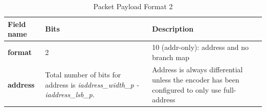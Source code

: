 \begin{table}[!h]
    \centering
    \caption{Packet Payload Format 2}
    \label{tab:te_inst2}
    \begin{tabulary}{\textwidth}{|l|p{35mm}|p{80mm}|}
        \hline
        {\bf Field name} & {\bf Bits} & {\bf Description} \\
        \hline
        \textbf{format}	& 2	& 10 (addr-only): address and no branch map\\
        \hline
        \textbf{address} & Total number of bits 
                  for address is
                  \textit {iaddress\_width\_p - iaddress\_lsb\_p}. & 
                  Address is always differential unless the encoder has been configured to only use full-address\\ 
        \hline
    \end{tabulary}
\end{table}

